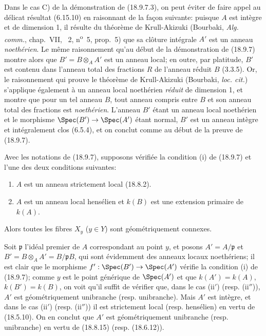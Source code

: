 \begin{remark}[18.9.7.8]
\label{IV.18.9.7.8}
Dans le cas C) de la démonstration de (18.9.7.3), on peut éviter de faire appel au délicat résultat (6.15.10) en raisonnant de la façon suivante: puisque $A$ est intègre et de dimension 1, il résulte du théorème de Krull-Akizuki (Bourbaki, \emph{Alg. comm.}, chap.~VII, \textsection~2, n\textsuperscript{o}~5, prop.~5) que sa clôture intégrale $A'$ est un anneau \emph{noethérien}. Le même raisonnement qu'au début de la démonstration de (18.9.7) montre alors que $B'=B\otimes_A A'$ est un anneau local; en outre, par platitude, $B'$ est contenu dans l'anneau total des fractions $R$ de l'anneau réduit $B$ (3.3.5). Or, le raisonnement qui prouve le théorème de Krull-Akizuki (Bourbaki, \emph{loc. cit.}) s'applique également à un anneau local noethérien \emph{réduit} de dimension 1, et montre que pour un tel anneau $B$, tout anneau compris entre $B$ et son anneau total des fractions est \emph{noethérien}. L'anneau $B'$ étant un anneau local noethérien et le morphisme $\Spec(B')\to\Spec(A')$ étant normal, $B'$ est un anneau intègre et intégralement clos (6.5.4), et on conclut comme au début de la preuve de (18.9.7).
\end{remark}

\begin{corollary}[18.9.8]
\label{IV.18.9.8}
Avec les notations de (18.9.7), supposons vérifiée la condition (i) de (18.9.7) et l'une des deux conditions suivantes:
\begin{enumerate}
  \item[(ii$'$)] $A$ est un anneau strictement local (18.8.2).
  \item[(ii$''$)] $A$ est un anneau local hensélien et $k(B)$ est une extension primaire de $k(A)$.
\end{enumerate}
Alors toutes les fibres $X_y$ ($y\in Y$) sont géométriquement connexes.
\end{corollary}

Soit $\mathfrak p$ l'idéal premier de $A$ correspondant au point $y$, et posons $A'=A/\mathfrak p$ et $B'=B\otimes_A A'=B/\mathfrak pB$, qui sont évidemment des anneaux locaux noethériens; il est clair que le morphisme $f':\Spec(B')\to\Spec(A')$ vérifie la condition (i) de (18.9.7); comme $y$ est le point générique de $\Spec(A')$ et que $k(A')=k(A)$, $k(B')=k(B)$, on voit qu'il suffit de vérifier que, dans le cas (ii$'$) (resp. (ii$''$)), $A'$ est géométriquement unibranche (resp. unibranche). Mais $A'$ est intègre, et dans le cas (ii$'$) (resp. (ii$''$)) il est strictement local (resp. hensélien) en vertu de (18.5.10). On en conclut que $A'$ est géométriquement unibranche (resp. unibranche) en vertu de (18.8.15) (resp. (18.6.12)).

